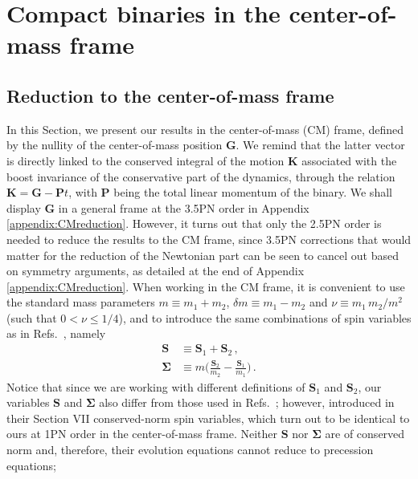 \documentclass[
superscriptaddress,
preprint,
prd,tightenlines,showpacs,nofootinbib,
eqsecnum,
amsfonts,amsmath,amssymb]{revtex4-1}
\begin{document}
\section{Compact binaries in the center-of-mass frame}
\label{sec:CM}

\subsection{Reduction to the center-of-mass frame}
\label{subsec:CMreduction}

In this Section, we present our results in the center-of-mass (CM)
frame, defined by the nullity of the center-of-mass position
$\mathbf{G}$. We remind that the latter vector is directly linked to
the conserved integral of the motion $\mathbf{K}$ associated with the
boost invariance of the conservative part of the dynamics, through the
relation $\mathbf{K} = \mathbf{G} - \mathbf{P} t$, with $\mathbf{P}$
being the total linear momentum of the binary. We shall display
$\mathbf{G}$ in a general frame at the 3.5PN order in Appendix
\ref{appendix:CMreduction}. However, it turns out that only the 2.5PN
order is needed to reduce the results to the CM frame, since 3.5PN
corrections that would matter for the reduction of the Newtonian part
can be seen to cancel out based on symmetry arguments, as detailed at
the end of Appendix \ref{appendix:CMreduction}. When working in the CM
frame, it is convenient to use the standard mass parameters $m\equiv
m_1+m_2$, $\delta m \equiv m_1-m_2$ and $\nu\equiv m_1\,m_2/m^2$ (such
that $0<\nu\leq 1/4$), and to introduce the same combinations of spin
variables as in Refs.~\cite{Faye2006,Blanchet2006}, namely
%
\begin{subequations}\label{SSigma}
\begin{align}
\mathbf{S} &\equiv \mathbf{S}_1 + \mathbf{S}_2 \, , \\ \mathbf{\Sigma}
&\equiv m \Big(\frac{\mathbf{S}_2}{m_2} - \frac{\mathbf{S}_1}{m_1}
\Big)\, .
\end{align}
\end{subequations}
%
Notice that since we are working with different definitions of
$\mathbf{S}_1$ and $\mathbf{S}_2$, our variables $\mathbf{S}$ and
$\mathbf{\Sigma}$ also differ from those used in
Refs.~\cite{Faye2006,Blanchet2006}; however, \cite{Blanchet2006} introduced
in their Section VII conserved-norm spin variables, which turn out to be
identical to ours at 1PN order in the center-of-mass frame. Neither
 $\mathbf{S}$ nor $\mathbf{\Sigma}$ are of conserved norm and,
therefore, their evolution equations cannot reduce to precession equations;
\end{document}
